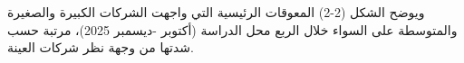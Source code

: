 ويوضح الشكل (2-2) المعوقات الرئيسية التي واجهت الشركات الكبيرة والصغيرة والمتوسطة على السواء خلال الربع محل الدراسة (أكتوبر -ديسمبر 2025)، مرتبة حسب شدتها من وجهة نظر شركات العينة.